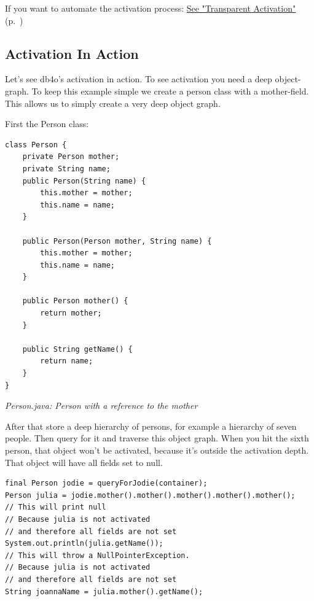 If you want to automate the activation process: \hyperref[ref:basics-activation-concept-transparent-activation-framework]{See "Transparent Activation"} (p.~\pageref{ref:basics-activation-concept-transparent-activation-framework})

\subsection{Activation In Action}
\label{ref:basics-activation-concept-hitting-activation-depth-wall}

Let's see db4o's activation in action. To see activation you need a deep object-graph. To keep this example simple we create a person class with a mother-field. This allows us to simply create a very deep object graph.

First the Person class:

\begin{lstlisting}
class Person {
    private Person mother;
    private String name;
    public Person(String name) {
        this.mother = mother;
        this.name = name;
    }

    public Person(Person mother, String name) {
        this.mother = mother;
        this.name = name;
    }

    public Person mother() {
        return mother;
    }

    public String getName() {
        return name;
    }
}
\end{lstlisting}

{\small\itshape Person.java: Person with a reference to the mother\par}
\medskip

After that store a deep hierarchy of persons, for example a hierarchy of seven people. Then query for it and traverse this object graph. When you hit the sixth person, that object won't be activated, because it's outside the activation depth. That object will have all fields set to null.

\begin{lstlisting}
final Person jodie = queryForJodie(container);
Person julia = jodie.mother().mother().mother().mother().mother();
// This will print null
// Because julia is not activated
// and therefore all fields are not set
System.out.println(julia.getName());
// This will throw a NullPointerException.
// Because julia is not activated
// and therefore all fields are not set
String joannaName = julia.mother().getName();
\end{lstlisting}

